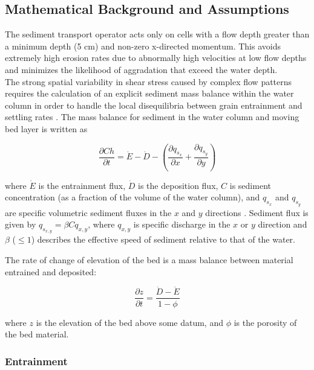 \documentclass[10pt]{article}
\begin{document}
\subsection{Mathematical Background and Assumptions}

The sediment transport operator acts only on cells with a flow depth greater than a minimum depth (5 cm) and non-zero x-directed momentum. This avoids extremely high erosion rates due to abnormally high velocities at low flow depths and minimizes the likelihood of aggradation that exceed the water depth.
\ \\

The strong spatial variability in shear stress caused by complex flow patterns requires the calculation of an explicit sediment mass balance within the water column in order to handle the local disequilibria between grain entrainment and settling rates \citep{davy2009fluvial}. The mass balance for sediment in the water column and moving bed layer is written as

\begin{equation}
\frac{\partial C h}{\partial t} = \dot{E} - \dot{D} - \left(\frac{\partial q_{s_x}}{\partial x} + \frac{\partial q_{s_y}}{\partial y} \right)
\end{equation}

\noindent where $\dot{E}$ is the entrainment flux, $\dot{D}$ is the deposition flux, $C$ is sediment concentration (as a fraction of the volume of the water column), and $q_{s_x}$ and $q_{s_y}$ are specific volumetric sediment fluxes in the $x$ and $y$ directions \citep[e.g.,][]{davy2009fluvial}. Sediment flux is given by $q_{s_{x,y}} = \beta C q_{x,y}$, where $q_{x,y}$ is specific discharge in the $x$ or $y$ direction and $\beta$ ($\le 1$) describes the effective speed of sediment relative to that of the water.

The rate of change of elevation of the bed is a mass balance between material entrained and deposited:

\begin{equation}
\frac{\partial z}{\partial t} = \frac{\dot{D} - \dot{E}}{1 - \phi}
\end{equation}

\noindent where $z$ is the elevation of the bed above some datum, and $\phi$ is the porosity of the bed material.

\subsubsection{Entrainment}
\end{document}
